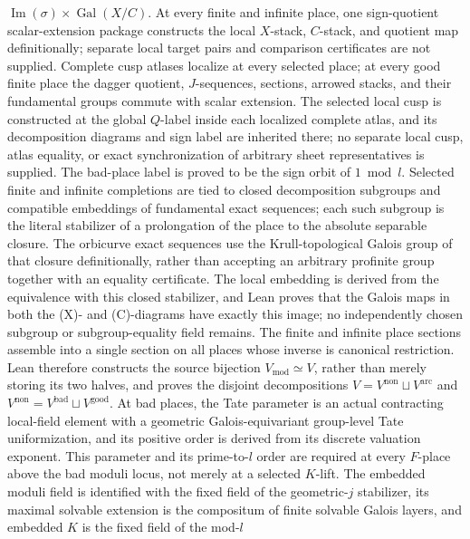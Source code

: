 \begin{definition}
  \(\operatorname{Im}(\sigma)\times\operatorname{Gal}(X/C)\).
  At every finite and infinite place, one sign-quotient scalar-extension
  package constructs the local \(X\)-stack, \(C\)-stack, and quotient map
  definitionally; separate local target pairs and comparison certificates are
  not supplied.  Complete cusp atlases localize at every selected place; at every good finite
  place the dagger quotient, \(J\)-sequences, sections, arrowed stacks, and
  their fundamental groups commute with scalar extension.  The selected local
  cusp is constructed at the global \(Q\)-label inside each localized complete
  atlas, and its decomposition diagrams and sign label are inherited there;
  no separate local cusp, atlas equality, or exact synchronization of arbitrary
  sheet representatives is supplied.  The bad-place label is proved to be the
  sign orbit of \(1\bmod l\).  Selected finite and infinite
  completions are tied to closed decomposition subgroups and compatible
  embeddings of fundamental exact sequences; each such subgroup is the
  literal stabilizer of a prolongation of the place to the absolute separable
  closure.  The orbicurve exact sequences use the Krull-topological Galois
  group of that closure definitionally, rather than accepting an arbitrary
  profinite group together with an equality certificate.  The local embedding
  is derived from the equivalence with this closed stabilizer, and Lean proves
  that the Galois maps in both the (X)- and (C)-diagrams have exactly this
  image; no independently chosen subgroup or subgroup-equality field remains.
  The finite and infinite place sections assemble into a single section on all
  places whose inverse is canonical restriction.  Lean therefore constructs
  the source bijection \(V_{\mathrm{mod}}\simeq V\), rather than merely storing
  its two halves, and proves the disjoint decompositions
  \(V=V^{\mathrm{non}}\sqcup V^{\mathrm{arc}}\) and
  \(V^{\mathrm{non}}=V^{\mathrm{bad}}\sqcup V^{\mathrm{good}}\).
  At bad places, the Tate
  parameter is an actual contracting local-field element with a geometric
  Galois-equivariant group-level Tate uniformization, and its positive order
  is derived from its discrete valuation exponent.  This parameter and its
  prime-to-\(l\) order are required at every \(F\)-place above the bad moduli
  locus, not merely at a selected \(K\)-lift.  The embedded moduli field is
  identified with the fixed field of the geometric-\(j\) stabilizer, its
  maximal solvable extension is the compositum of finite solvable Galois
  layers, and embedded \(K\) is the fixed field of the mod-\(l\)

\end{definition}
